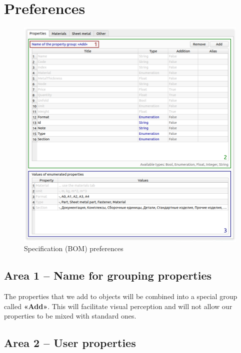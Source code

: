 \documentclass[a4paper,12pt]{article}
\begin{document}
\pagebreak




\section{Preferences}

\begin{figure}[htp]
	\centering
	\includegraphics[width=1.0\textwidth]{img/pref_specification.png}
	\caption{Specification (BOM) preferences}
	\label{sec:pref_specification}
\end{figure}

\subsection{Area 1 -- Name for grouping properties}
The properties that we add to objects will be combined into a special group called \textbf{«Add»}. This will facilitate visual perception and will not allow our properties to be mixed with standard ones.

\pagebreak


\subsection{Area 2 -- User properties}
\end{document}
